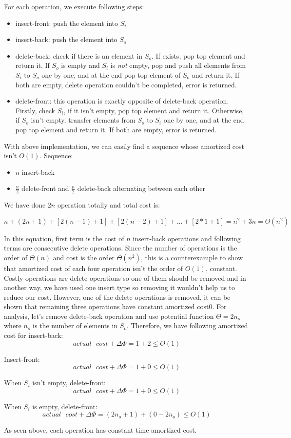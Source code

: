 \clearpage
For each operation, we execute following steps:
\begin{itemize}
\item insert-front: push the element into $S_{i}$
\item insert-back: push the element into $S_{o}$
\item delete-back: check if there is an element in $S_{o}$. If exists, pop top element and return it. If $S_{o}$ is empty and $S_{i}$ is \textit{not} empty, pop and push all elements from $S_{i}$ to $S_{o}$ one by one, and at the end pop top element of $S_{o}$ and return it. If both are empty, delete operation couldn't be completed, error is returned.
\item delete-front: this operation is exactly opposite of delete-back operation. Firstly, check $S_{i}$, if it isn't empty, pop top element and return it. Otherwise, if $S_{o}$ isn't empty, transfer elements from $S_{o}$ to $S_{i}$ one by one, and at the end pop top element and return it. If both are empty, error is returned.
\end{itemize}

With above implementation, we can easily find a sequence whose amortized cost isn't $O(1)$. Sequence:

\begin{itemize}
\item $n$ insert-back
\item $\frac{n}{2}$ delete-front and $\frac{n}{2}$ delete-back alternating between each other
\end{itemize} 

We have done $2n$ operation totally and total cost is:

$$
n + (2n + 1) + [2(n-1) + 1] + [2(n-2) + 1] + \dots + [2*1 + 1] = n^{2} + 3n = \Theta(n^{2})
$$

In this equation, first term is the cost of $n$ insert-back operations and following terms are consecutive delete operations. Since the number of operations is the order of $\Theta(n)$ and cost is the order $\Theta(n^{2})$, this is a counterexample to show that amortized cost of each four operation isn't the order of $O(1)$, constant. Costly operations are delete operations so one of them should be removed and in another way, we have used one insert type so removing it wouldn't help us to reduce our cost. However, one of the delete operations is removed, it can be shown that remaining three operations have constant amortized cost0. For analysis, let's remove delete-back operation and use potential function $\Theta = 2n_{o}$ where $n_{o}$ is the number of elements in $S_{o}$. Therefore, we have following amortized cost for insert-back:
$$
actual\text{ }cost + \Delta\Phi = 1 + 2 \leq O(1)
$$

Insert-front:
$$
actual\text{ }cost + \Delta\Phi = 1 + 0 \leq O(1)
$$

When $S_{i}$ isn't empty, delete-front:
$$
actual\text{ }cost + \Delta\Phi = 1 + 0 \leq O(1)
$$

When $S_{i}$ is empty, delete-front:
$$
actual\text{ }cost + \Delta\Phi = (2n_{o} + 1) + (0 - 2n_{o}) \leq O(1)
$$

As seen above, each operation has constant time amortized cost.